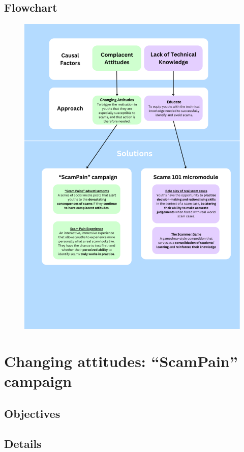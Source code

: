 \message{ !name(written-report.tex)}\documentclass[a4paper]{article}
\begin{document}
\subsection{Flowchart}
\begin{figure}[ht!]
  \centering \includegraphics[width=\textwidth]{flowchart}\label{fig:flowchart}
\end{figure}

\section{Changing attitudes: ``ScamPain'' campaign}
\subsection{Objectives}
\subsection{Details}
\end{document}

